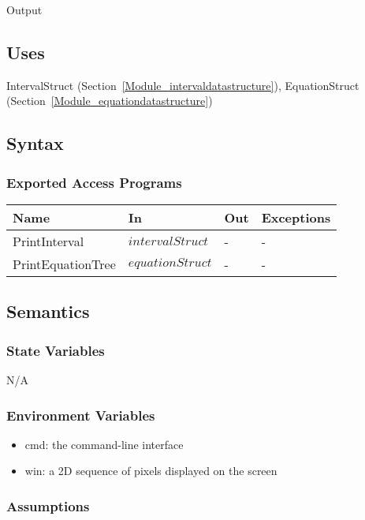 \documentclass[12pt, titlepage]{article}
\begin{document}
Output

\subsection{Uses}

IntervalStruct (Section~\ref{Module_intervaldatastructure}), EquationStruct 
(Section~\ref{Module_equationdatastructure})

\subsection{Syntax}

\subsubsection{Exported Access Programs}

\begin{center}
	\begin{tabular}{p{3.1cm} p{3cm} p{3cm} p{5cm}}
		\hline
		\textbf{Name} & \textbf{In} & \textbf{Out} & \textbf{Exceptions} \\
		\hline
		PrintInterval & $intervalStruct$ & - & - \\
		PrintEquationTree & $equationStruct$ & - & - \\
		\hline
	\end{tabular}
\end{center}

\subsection{Semantics}

\subsubsection{State Variables}

N/A

\subsubsection{Environment Variables}

\begin{itemize}
	\item cmd: the command-line interface
	\item win: a 2D sequence of pixels displayed on the screen
\end{itemize}

\subsubsection{Assumptions}
\end{document}
